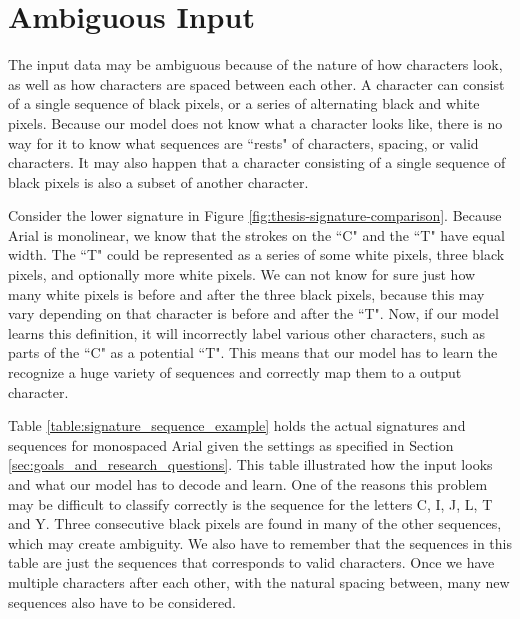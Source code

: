 
\section{Ambiguous Input}
The input data may be ambiguous because of the nature of how characters look, as well as how characters are spaced between each other. A character can consist of a single sequence of black pixels, or a series of alternating black and white pixels. Because our model does not know what a character looks like, there is no way for it to know what sequences are ``rests" of characters, spacing, or valid characters. It may also happen that a character consisting of a single sequence of black pixels is also a subset of another character. 

Consider the lower signature in Figure \ref{fig:thesis-signature-comparison}. Because Arial is monolinear, we know that the strokes on the ``C" and the ``T" have equal width. The ``T" could be represented as a series of some white pixels, three black pixels, and optionally more white pixels. We can not know for sure just how many white pixels is before and after the three black pixels, because this may vary depending on that character is before and after the ``T". Now, if our model learns this definition, it will incorrectly label various other characters, such as parts of the ``C" as a potential ``T". This means that our model has to learn the recognize a huge variety of sequences and correctly map them to a output character.

Table \ref{table:signature_sequence_example} holds the actual signatures and sequences for monospaced Arial given the settings as specified in Section \ref{sec:goals_and_research_questions}. This table illustrated how the input looks and what our model has to decode and learn. One of the reasons this problem may be difficult to classify correctly is the sequence for the letters C, I, J, L, T and Y. Three consecutive black pixels are found in many of the other sequences, which may create ambiguity. We also have to remember that the sequences in this table are just the sequences that corresponds to valid characters. Once we have multiple characters after each other, with the natural spacing between, many new sequences also have to be considered.

